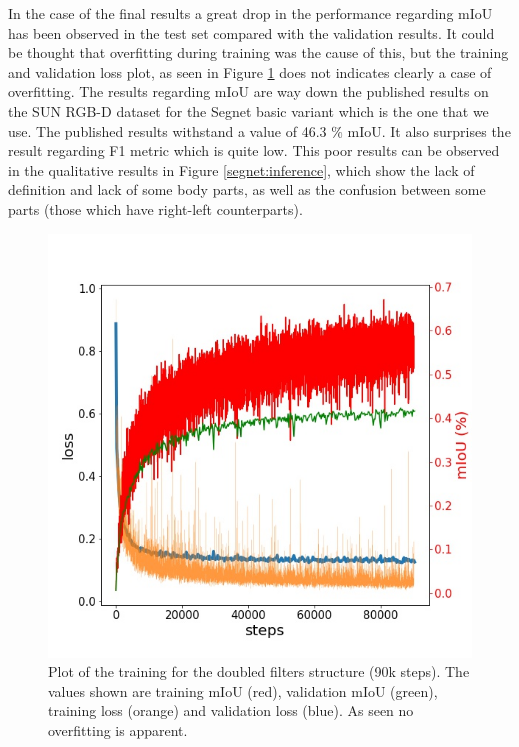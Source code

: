 In the case of the final results a great drop in the performance regarding mIoU has been observed in the test set compared with the validation results. It could be thought that overfitting during training was the cause of this, but the training and validation loss plot, as seen in Figure \ref{segnet:over} does not indicates clearly a case of overfitting. The results regarding mIoU are way down the published results on the SUN RGB-D dataset for the Segnet basic variant which is the one that we use. The published results withstand a value of 46.3 $\%$ mIoU. It also surprises the result regarding F1 metric which is quite low. This poor results can be observed in the qualitative results in Figure \ref{segnet:inference}, which show the lack of definition and lack of some body parts, as well as the confusion between some parts (those which have right-left counterparts).\newline

\begin{figure}
\centering
\includegraphics[scale=0.4]{seg_res_3.jpg}
\caption{Plot of the training for the doubled filters structure (90k steps). The values shown are training mIoU (red), validation mIoU (green), training loss (orange) and validation loss (blue). As seen no overfitting is apparent.}
\label{segnet:over}
\end{figure}

